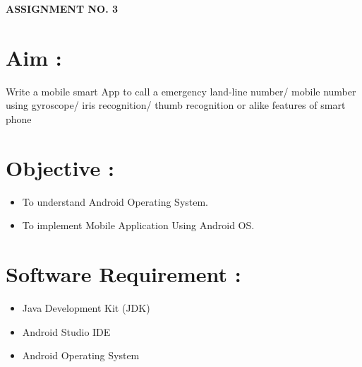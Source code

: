 \documentclass{article}
\begin{document}
\begin{center}
\textbf{\bfseries\Large ASSIGNMENT NO. 3}
\\[1cm]
\end{center}


\section{Aim : } 
	Write a mobile smart App to call a emergency land-line number/ mobile number using gyroscope/ iris
recognition/ thumb recognition or alike features of smart phone


\section{Objective : }  
	\begin{itemize}
		\item To understand Android Operating System.
		\item To implement Mobile Application Using Android OS.
	\end{itemize}

\section{Software Requirement : }  
	\begin{itemize}
    	\item Java Development Kit (JDK)
		\item Android Studio IDE
		\item Android Operating System
	\end{itemize}
\end{document}
